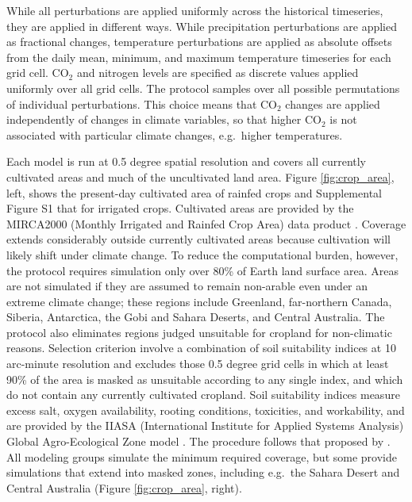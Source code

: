 \documentclass[gmd, manuscript]{copernicus} %
\begin{document}
While all perturbations are applied uniformly across the historical timeseries, they are applied in different ways. 
While precipitation perturbations are applied as fractional changes, temperature perturbations are applied as absolute offsets from the daily mean, minimum, and maximum temperature timeseries for each grid cell.
CO$_2$ and nitrogen levels are specified as discrete values applied uniformly over all grid cells. 
The protocol samples over all possible permutations of individual perturbations.
This choice means that CO$_2$ changes are applied independently of changes in climate variables, so that higher CO$_2$ is not associated with particular climate changes, e.g.\ higher temperatures. 

Each model is run at 0.5 degree spatial resolution and covers all currently cultivated areas and much of the uncultivated land area. 
Figure \ref{fig:crop_area}, left, shows the present-day cultivated area of rainfed crops and Supplemental Figure S1 that for irrigated crops. 
Cultivated areas are provided by the MIRCA2000 (Monthly Irrigated and Rainfed Crop Area) data product \citep{Portmann2010}.
Coverage extends considerably outside currently cultivated areas because cultivation will likely shift under climate change.  
To reduce the computational burden, however, the protocol requires simulation only over 80\% of Earth land surface area.  
Areas are not simulated if they are assumed to remain non-arable even under an extreme climate change; these regions include Greenland, far-northern Canada, Siberia, Antarctica, the Gobi and Sahara Deserts, and Central Australia.
The protocol also eliminates regions judged unsuitable for cropland for non-climatic reasons. 
Selection criterion involve a combination of soil suitability indices at 10 arc-minute resolution and excludes those 0.5 degree grid cells in which at least 90\% of the area is masked as unsuitable according to any single index, and which do not contain any currently cultivated cropland. 
Soil suitability indices measure excess salt, oxygen availability, rooting conditions, toxicities, and workability, and are provided by the IIASA (International Institute for Applied Systems Analysis) Global Agro-Ecological Zone model \citep[GAEZ, ][]{gaez}. 
The procedure follows that proposed by \citet{pugh_climate_2016}. 
All modeling groups simulate the minimum required coverage, but some provide simulations that extend into masked zones, including e.g.\ the Sahara Desert and Central Australia (Figure \ref{fig:crop_area}, right).
\end{document}
